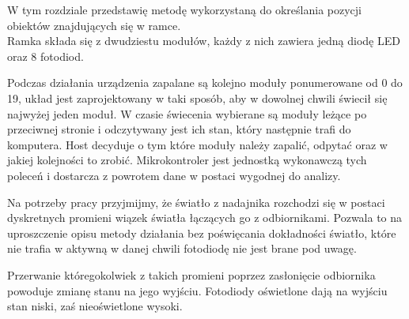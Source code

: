 \label{ch:current_state}

W tym rozdziale przedstawię metodę wykorzystaną do określania pozycji obiektów znajdujących się w ramce.\\

Ramka składa się z dwudziestu modułów, każdy z nich zawiera jedną diodę LED oraz 8 fotodiod.

Podczas działania urządzenia zapalane są kolejno moduły ponumerowane od 0 do 19, układ jest zaprojektowany w taki sposób, aby w dowolnej chwili świecił się najwyżej jeden moduł. W czasie świecenia wybierane są moduły leżące po przeciwnej stronie i odczytywany jest ich stan, który następnie trafi do komputera. Host decyduje o tym które moduły należy zapalić, odpytać oraz w jakiej kolejności to zrobić. Mikrokontroler jest jednostką wykonawczą tych poleceń i dostarcza z powrotem dane w postaci wygodnej do analizy.

Na potrzeby pracy przyjmijmy, że światło z nadajnika rozchodzi się w postaci dyskretnych promieni \pauza wiązek światła łączących go z odbiornikami. Pozwala to na uproszczenie opisu metody działania bez poświęcania dokładności \pauza światło, które nie trafia w aktywną w danej chwili fotodiodę nie jest brane pod uwagę.

Przerwanie któregokolwiek z takich promieni poprzez zasłonięcie odbiornika powoduje zmianę stanu na jego wyjściu. Fotodiody oświetlone dają na wyjściu stan niski, zaś nieoświetlone \ppauza wysoki.

